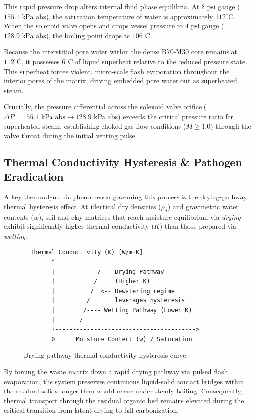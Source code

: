 \documentclass[10pt,twocolumn,a4paper]{article}
\begin{document}
This rapid pressure drop alters internal fluid phase equilibria. At $8\text{ psi}$ gauge ($155.1\text{ kPa abs}$), the saturation temperature of water is approximately $112^\circ\text{C}$. When the solenoid valve opens and drops vessel pressure to $4\text{ psi}$ gauge ($128.9\text{ kPa abs}$), the boiling point drops to $106^\circ\text{C}$.

Because the interstitial pore water within the dense B70-M30 core remains at $112^\circ\text{C}$, it possesses $6^\circ\text{C}$ of liquid superheat relative to the reduced pressure state. This superheat forces violent, micro-scale flash evaporation throughout the interior pores of the matrix, driving embedded pore water out as superheated steam.

Crucially, the pressure differential across the solenoid valve orifice ($\Delta P = 155.1\text{ kPa abs} \rightarrow 128.9\text{ kPa abs}$) exceeds the critical pressure ratio for superheated steam, establishing choked gas flow conditions ($M \ge 1.0$) through the valve throat during the initial venting pulse.

\subsection{Thermal Conductivity Hysteresis \& Pathogen Eradication}

A key thermodynamic phenomenon governing this process is the drying-pathway thermal hysteresis effect. At identical dry densities ($\rho_d$) and gravimetric water contents ($w$), soil and clay matrices that reach moisture equilibrium via \textit{drying} exhibit significantly higher thermal conductivity ($K$) than those prepared via \textit{wetting}.

\begin{figure}[H]
\centering
\small
\begin{verbatim}
  Thermal Conductivity (K) [W/m·K]
        ^
        |            /--- Drying Pathway
        |           /     (Higher K)
        |          /  <-- Dewatering regime
        |         /       leverages hysteresis
        |        /---- Wetting Pathway (Lower K)
        |       /
        +---------------------------------------->
        0      Moisture Content (w) / Saturation
\end{verbatim}
\caption{Drying pathway thermal conductivity hysteresis curve.}
\label{fig:hysteresis}
\end{figure}

By forcing the waste matrix down a rapid drying pathway via pulsed flash evaporation, the system preserves continuous liquid-solid contact bridges within the residual solids longer than would occur under steady boiling. Consequently, thermal transport through the residual organic bed remains elevated during the critical transition from latent drying to full carbonization.
\end{document}
